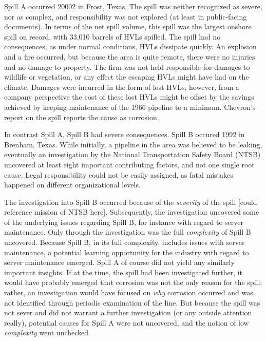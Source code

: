 \documentclass[12pt, man, natbib]{apa6}
\begin{document}
	Spill A occurred 20002 in Frost, Texas. The spill was neither recognized as severe, nor as complex, and responsibility was not explored (at least in public-facing documents). In terms of the net spill volume, this spill was the largest onshore spill on record, with 33,010 barrels of HVLs spilled. The spill had no consequences, as under normal conditions, HVLs dissipate quickly. An explosion and a fire occurred, but because the area is quite remote, there were no injuries and no damage to property. The firm was not held responsible for damages to wildlife or vegetation, or any effect the escaping HVLs might have had on the climate. Damages were incurred in the form of lost HVLs, however, from a company perspective the cost of these lost HVLs might be offset by the savings achieved by keeping maintenance of the 1966 pipeline to a minimum. Chevron's report on the spill reports the cause as corrosion.
	
	In contrast Spill A, Spill B had severe consequences. Spill B occured 1992 in Brenham, Texas. While initially, a pipeline in the area was believed to be leaking, eventually an investigation by the National Transportation Safety Board (NTSB) uncovered at least eight important contributing factors, and not one single root cause. Legal responsibility could not be easily assigned, as fatal mistakes happened on different organizational levels. 
	
	The investigation into Spill B occurred because of the \textit{severity} of the spill [could reference mission of NTSB here]. Subsequently, the investigation uncovered some of the underlying issues regarding Spill B, for instance with regard to server maintenance. Only through the investigation was the full \textit{complexity} of Spill B uncovered. Because Spill B, in its full complexity, includes issues with server maintenance, a potential learning opportunity for the industry with regard to server maintenance emerged. Spill A of course did not yield any similarly important insights. If at the time, the spill had been investigated further, it would have probably emerged that corrosion was not the only reason for the spill; rather, an investigation would have focused on \textit{why} corrosion occurred and was not identified through periodic examination of the line. But because the spill was not sever and did not warrant a further investigation (or any outside attention really), potential causes for Spill A were not uncovered, and the notion of low \textit{complexity} went unchecked.
	
\end{document}

